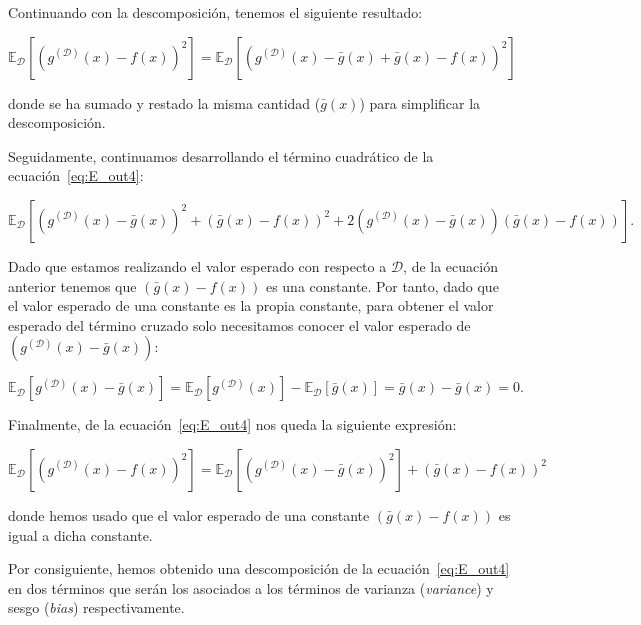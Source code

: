 Continuando con la descomposición, tenemos el siguiente resultado:

\begin{equation}\label{eq:E_out4}
    \mathbb{E}_{\mathcal{D}}[{(g^{\mathcal{(D)}}(x) - f(x))}^2] = \mathbb{E}_{\mathcal{D}}[{(g^{\mathcal{(D)}}(x) - \bar{g}(x) + \bar{g}(x) - f(x))}^2]
\end{equation}

donde se ha sumado y restado la misma cantidad ($\bar{g}(x)$) para simplificar la descomposición.\newline

Seguidamente, continuamos desarrollando el término cuadrático de la ecuación~\eqref{eq:E_out4}:

\[ \mathbb{E}_{\mathcal{D}}[{(g^{\mathcal{(D)}}(x) - \bar{g}(x))}^2 + {(\bar{g}(x) - f(x))}^2 + 2(g^{\mathcal{(D)}}(x) - \bar{g}(x))(\bar{g}(x) - f(x))]. \]\newline

Dado que estamos realizando el valor esperado con respecto a $\mathcal{D}$, de la ecuación anterior tenemos que $(\bar{g}(x) - f(x))$ es una constante. Por tanto, dado que el valor esperado de una constante es la propia constante, para obtener el valor esperado del término cruzado solo necesitamos conocer el valor esperado de $(g^{\mathcal{(D)}}(x) - \bar{g}(x))$:

\begin{equation}\label{eq:E_out6}
    \mathbb{E}_{\mathcal{D}}[g^{\mathcal{(D)}}(x) - \bar{g}(x)] = \mathbb{E}_{\mathcal{D}}[g^{\mathcal{(D)}}(x)] - \mathbb{E}_{\mathcal{D}}[\bar{g}(x)] = \bar{g}(x) - \bar{g}(x) = 0.
\end{equation}\newline

Finalmente, de la ecuación~\eqref{eq:E_out4} nos queda la siguiente expresión:

\begin{equation}\label{eq:E_out7}
    \mathbb{E}_{\mathcal{D}}[{(g^{\mathcal{(D)}}(x) - f(x))}^2] = \mathbb{E}_{\mathcal{D}}[{(g^{\mathcal{(D)}}(x) - \bar{g}(x))}^2] + {(\bar{g}(x) - f(x))}^2
\end{equation}

donde hemos usado que el valor esperado de una constante $(\bar{g}(x) - f(x))$ es igual a dicha constante.\newline

Por consiguiente, hemos obtenido una descomposición de la ecuación~\eqref{eq:E_out4} en dos términos que serán los asociados a los términos de varianza (\textit{variance}) y sesgo (\textit{bias}) respectivamente.

